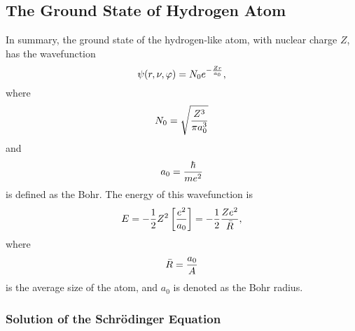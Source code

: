 \subsection{The Ground State of Hydrogen Atom}
\label{app-d}
    
In summary, the ground state of the hydrogen-like atom, with nuclear 
charge $Z$, has the wavefunction
\begin{equation}
\psi ( r , \nu , \varphi ) = N_0 e^{-{Zr \over a_0}} ,
\end{equation}
where
\begin{equation}
N_0  = \sqrt{{Z^3 \over \pi a^3_0}}
\end{equation}  
and
\begin{equation}
a_0 = {\hbar \over me^2}
\end{equation}  
is defined as the Bohr. The energy of this wavefunction is
\begin{equation}
E = - {1 \over 2} Z^2 \left[ {e^2 \over a_0} \right] = - {1 \over 2} 
{Ze^2 \over {\bar R}} ,
\end{equation}
where
\begin{equation}
{\bar R} = {a_0 \over A}
\end{equation}
is the average size of the atom, and $a_0$ is denoted as the Bohr radius.

\subsubsection{Solution of the Schr\"odinger Equation}
    
